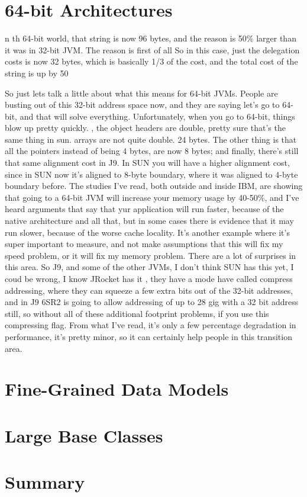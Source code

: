\documentclass{book}
\theoremstyle{definition}
\begin{document}
\section{64-bit Architectures}

n th 64-bit world, that string is now 96 bytes, and the reason is 50\% larger than it was in 32-bit JVM. The reason is first of all So in this case, just the delegation costs is now 32 bytes, which is basically 1/3 of the cost, and the total cost of the string is up by 50%


So just lets talk a little about what this means for 64-bit JVMs. People are busting out of this 32-bit address space now, and they are saying let's go to 64-bit, and that will solve everything. Unfortunately, when you go to 64-bit, things blow up pretty quickly. , the object headers are double, pretty sure that's the same thing in sun. arrays are not quite double. 24 bytes. The other thing is that all the pointers instead of being 4 bytes, are now 8 bytes; and finally, there's still that same alignment cost in J9. In SUN you will have a higher alignment cost, since in SUN now it's aligned to 8-byte boundary, where it was aligned to 4-byte boundary before.  The studies I've read, both outside and inside IBM, are showing that going to a 64-bit JVM will increase your memory usage by 40-50\%, and I've heard arguments that say that yur application will run faster, because of the native architecture and all that,  but in some cases there is evidence that it may run slower, because of the worse cache locality. It's another example where it's super important to measure, and not make assumptions that this will fix my speed problem, or it will fix my memory problem. There are a lot of surprises in this area. So J9, and some of the other JVMs, I don't think SUN has this yet, I coud be wrong, I know JRocket has it , they have a mode have called compress addressing, where they can squeeze a few extra bits out of the 32-bit addresses, and in J9 6SR2 is going to allow addressing of up to 28 gig with a 32 bit address still, so without all of these additional footprint problems, if you use this compressing flag. From what I've read, it's only a few percentage degradation in performance, it's pretty minor, so it can certainly help people in this transition area.







\section{Fine-Grained Data Models}
\label{fine-grained-data-models} 

\section{Large Base Classes}

\section{Summary}
\end{document}
